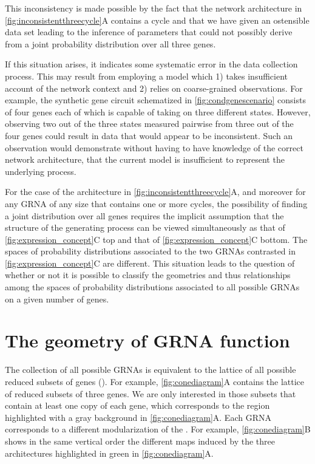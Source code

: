 This inconsistency is made possible by the fact that the network architecture in \ref{fig:inconsistentthreecycle}A contains a cycle \cite{Lauritzen1996,Geiger2006,Wainwright2007} and that we have given an ostensible data set leading to the inference of parameters that could not possibly derive from a joint probability distribution over all three genes.

If this situation arises, it indicates some systematic error in the data collection process. This may result from employing a model which 1) takes insufficient account of the network context and 2) relies on coarse-grained observations. For example, the synthetic gene circuit schematized in \ref{fig:condgenescenario} consists of four genes each of which is capable of taking on three different states. However, observing two out of the three states measured pairwise from three out of the four genes could result in data that would appear to be inconsistent. Such an observation would demonstrate without having to have knowledge of the correct network architecture, that the current model is insufficient to represent the underlying process.

For the case of the architecture in \ref{fig:inconsistentthreecycle}A, and moreover for any GRNA of any size that contains one or more cycles, the possibility of finding a joint distribution over all genes requires the implicit assumption that the structure of the generating process can be viewed simultaneously as that of \ref{fig:expression_concept}C top and that of \ref{fig:expression_concept}C bottom. The spaces of probability distributions associated to the two GRNAs contrasted in \ref{fig:expression_concept}C are different. This situation leads to the question of whether or not it is possible to classify the geometries and thus relationships among the spaces of probability distributions associated to all possible GRNAs on a given number of genes.

\section{The geometry of GRNA function}
The collection of all possible GRNAs is equivalent to the lattice of all possible reduced subsets of genes (). For example, \ref{fig:conediagram}A contains the lattice of reduced subsets of three genes. We are only interested in those subsets that contain at least one copy of each gene, which corresponds to the region highlighted with a gray background in \ref{fig:conediagram}A. Each GRNA corresponds to a different modularization of the \gnpm{}. For example, \ref{fig:conediagram}B shows in the same vertical order the different maps induced by the three architectures highlighted in green in \ref{fig:conediagram}A.


